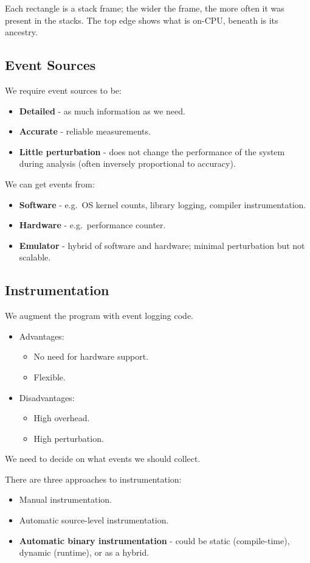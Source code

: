 \documentclass[11pt]{article}
\begin{document}
Each rectangle is a stack frame; the wider the frame, the more often it was present in the stacks.
The top edge shows what is on-CPU, beneath is its ancestry.

\subsection{Event Sources}
We require event sources to be:
\begin{itemize}
  \item \textbf{Detailed} - as much information as we need.
  \item \textbf{Accurate} - reliable measurements.
  \item \textbf{Little perturbation} - does not change the performance of the system during analysis (often inversely proportional to accuracy).
\end{itemize}

We can get events from:
\begin{itemize}
  \item \textbf{Software} - e.g.\ OS kernel counts, library logging, compiler instrumentation.
  \item \textbf{Hardware} - e.g.\ performance counter.
  \item \textbf{Emulator} - hybrid of software and hardware; minimal perturbation but not scalable.
\end{itemize}

\subsection{Instrumentation}
We augment the program with event logging code.
\begin{itemize}
  \item Advantages:
    \begin{itemize}
      \item No need for hardware support.
      \item Flexible.
    \end{itemize}
  \item Disadvantages:
    \begin{itemize}
      \item High overhead.
      \item High perturbation.
    \end{itemize}
\end{itemize}
We need to decide on what events we should collect.

There are three approaches to instrumentation:
\begin{itemize}
  \item Manual instrumentation.
  \item Automatic source-level instrumentation.
  \item \textbf{Automatic binary instrumentation} - could be static (compile-time), dynamic (runtime), or as a hybrid.
\end{itemize}
\end{document}
